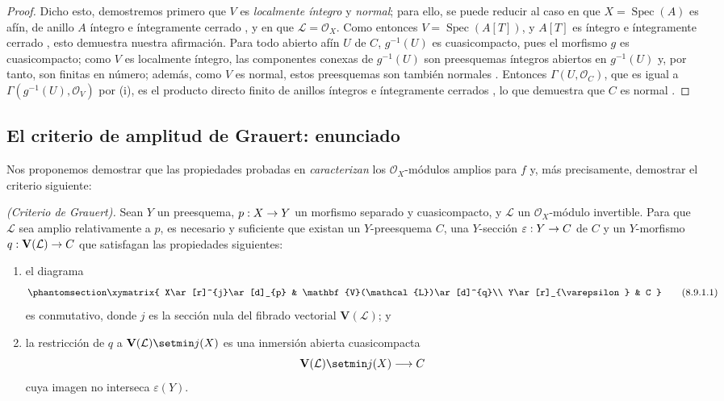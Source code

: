 \documentclass[oneside,10pt]{amsart}
\makeatletter
\newcommand{\ega@arrow}[2]{\mathchoice{#1}{#2}{#2}{#2}}
\renewcommand{\to}{\ega@arrow{\longrightarrow}{\rightarrow}}
\let\EGAOriginalLabel\label
\renewcommand{\label}[1]{\phantomsection\EGAOriginalLabel{#1}}
\makeatother
\begin{document}
\begin{proof}
Dicho esto, demostremos primero que $V$ es \emph{localmente íntegro} y \emph{normal};
para ello, se puede reducir al caso en que $X=\operatorname{Spec}(A)$ es afín, de anillo $A$ íntegro e íntegramente cerrado , y en que $\mathcal{L}=\mathcal{O}_X$.
Como entonces $V=\operatorname{Spec}(A[T])$, y $A[T]$ es íntegro e íntegramente cerrado \cite[p.~99]{II-24}, esto demuestra nuestra afirmación.
Para todo abierto afín $U$ de $C$, $g^{-1}(U)$ es cuasicompacto, pues el morfismo $g$ es cuasicompacto;
como $V$ es localmente íntegro, las componentes conexas de $g^{-1}(U)$ son preesquemas íntegros abiertos en $g^{-1}(U)$ y, por tanto, son finitas en número; además, como $V$ es normal, estos preesquemas son también normales .
Entonces $\Gamma(U,\mathcal{O}_C)$, que es igual a $\Gamma(g^{-1}(U),\mathcal{O}_V)$ por (i), es el producto directo finito de anillos íntegros e íntegramente cerrados , lo que demuestra que $C$ es normal .
\end{proof}
\subsection{El criterio de amplitud de Grauert: enunciado}
\label{subsection:II.8.9-fr}

Nos proponemos demostrar que las propiedades probadas en  \emph{caracterizan} los $\mathcal{O}_X$-módulos amplios para $f$ y, más precisamente, demostrar el criterio siguiente:
\begin{theorem}[8.9.1]
\label{II.8.9.1-fr}
\emph{(Criterio de Grauert).}
Sean $Y$ un preesquema, $p:X\to Y$ un morfismo separado y cuasicompacto, y $\mathcal{L}$ un $\mathcal{O}_X$-módulo invertible.
Para que $\mathcal{L}$ sea amplio relativamente a $p$, es necesario y suficiente que existan un $Y$-preesquema $C$, una $Y$-sección $\varepsilon:Y\to C$ de $C$ y un $Y$-morfismo $q:\mathbf{V}(\mathcal{L})\to C$ que satisfagan las propiedades siguientes:
\begin{enumerate}
  \item[\rm{(i)}] el diagrama
    \begin{equation}
  \label{II.8.9.1.1-fr}
    \xymatrix{
      X\ar[r]^{j}\ar[d]_{p} & \mathbf{V}(\mathcal{L})\ar[d]^{q}\\
      Y\ar[r]_{\varepsilon} & C
    }
  \tag{8.9.1.1}
  \end{equation}
    es conmutativo, donde $j$ es la sección nula del fibrado vectorial $\mathbf{V}(\mathcal{L})$; y
  \item[\rm{(ii)}] la restricción de $q$ a $\mathbf{V}(\mathcal{L})\setmin j(X)$ es una inmersión abierta cuasicompacta
    \[
    \mathbf{V}(\mathcal{L})\setmin j(X)\longrightarrow C
  \]
    cuya imagen no interseca $\varepsilon(Y)$.
\end{enumerate}
\end{theorem}
\end{document}
